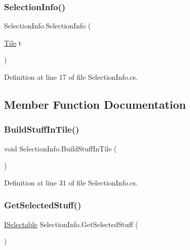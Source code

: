 \subsubsection{\texorpdfstring{Selection\+Info()}{SelectionInfo()}}
{\footnotesize\ttfamily Selection\+Info.\+Selection\+Info (\begin{DoxyParamCaption}\item[{\hyperlink{class_tile}{Tile}}]{t }\end{DoxyParamCaption})}



Definition at line 17 of file Selection\+Info.\+cs.



\subsection{Member Function Documentation}
\mbox{\label{class_selection_info_a184257ca4a6f7d0c9e60c8815d8c4b72}} 
\subsubsection{\texorpdfstring{Build\+Stuff\+In\+Tile()}{BuildStuffInTile()}}
{\footnotesize\ttfamily void Selection\+Info.\+Build\+Stuff\+In\+Tile (\begin{DoxyParamCaption}{ }\end{DoxyParamCaption})}



Definition at line 31 of file Selection\+Info.\+cs.

\mbox{\label{class_selection_info_a8ae5716ce65fb768ba41c5e2b86673db}} 
\subsubsection{\texorpdfstring{Get\+Selected\+Stuff()}{GetSelectedStuff()}}
{\footnotesize\ttfamily \hyperlink{interface_i_selectable}{I\+Selectable} Selection\+Info.\+Get\+Selected\+Stuff (\begin{DoxyParamCaption}{ }\end{DoxyParamCaption})}



